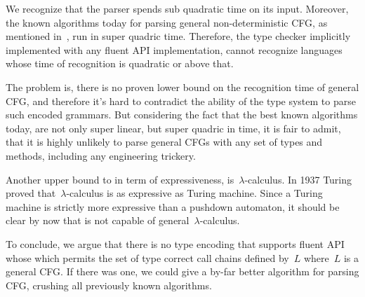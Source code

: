 We recognize that the \Java parser spends sub quadratic time
  on its input.
Moreover, the known algorithms today for parsing general 
  non-deterministic CFG, as mentioned in~, run in 
  super quadric time.
Therefore,
  the type checker implicitly implemented with any fluent API implementation,
  cannot recognize languages whose time of recognition is quadratic or above that.

The problem is, there is no proven lower bound on the recognition time of general CFG,
  and therefore it's hard to contradict the ability of the type system to parse such 
  encoded grammars.
But considering the fact that the best known algorithms today, 
  are not only super linear, but super quadric in time,
  it is fair to admit, that it is highly unlikely to parse general CFGs
  with any set of \Java types and methods, including any engineering trickery.

Another upper bound to \Self in term of expressiveness, is~$\lambda$-calculus.
In 1937 Turing~\cite{Turing:37} proved that~$\lambda$-calculus is as expressive as Turing machine.
Since a Turing machine is strictly more expressive than a pushdown automaton, 
  it should be clear by now that \Self is not capable of general~$\lambda$-calculus.


To conclude, we argue that there is no type encoding that supports fluent API whose
  which permits the set of type correct call chains defined by~$L$ where~$L$ is a general CFG\@. 
If there was one, we could give a by-far better algorithm for parsing CFG,
  crushing all previously known algorithms.
